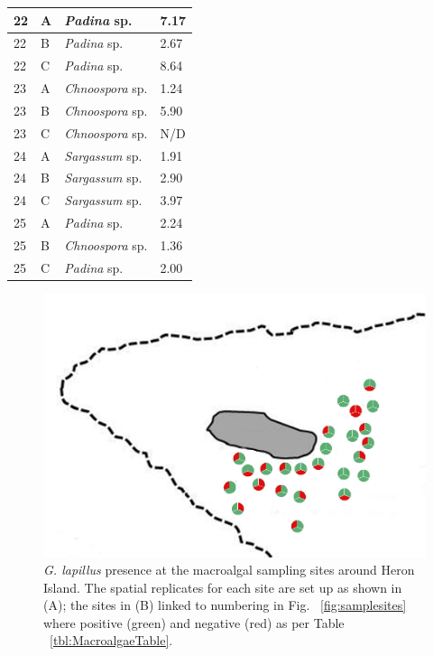 \documentclass[12pt]{article}
\begin{document}
\begin{longtable}{ | p{2cm} | p{2cm} | p{3cm} | p{3.5cm} |}
\hline
22
&A&\emph{Padina} sp.&7.17\\
\hline
22
&B&\emph{Padina} sp.&2.67\\
\hline
22
&C&\emph{Padina} sp.&8.64\\
\hline
23&A&\emph{Chnoospora }sp.&1.24
\\
\hline
23&B&\emph{Chnoospora }sp.&5.90
\\
\hline
23&C&\emph{Chnoospora} sp.&N/D\\
\hline
24&A&\emph{Sargassum} sp.&1.91
\\
\hline
24&B&\emph{Sargassum} sp.&2.90
\\
\hline
24&C&\emph{Sargassum} sp.&3.97
\\
\hline
25&A&\emph{Padina} sp.%
&2.24
\\
\hline
25&B&\emph{Chnoospora }sp.%
&1.36
\\
\hline
25&C&\emph{Padina} sp.%
&2.00
\\
\hline
\end{longtable}
\FloatBarrier
\begin{figure} 
\includegraphics[scale=2.5]{Hero_qpcr-figs/Fig5.png} 
\caption{\emph{G. lapillus} presence at the macroalgal sampling sites around Heron Island. The spatial replicates for each site are set up as shown in (A); the sites in (B) linked to numbering in Fig. ~\ref{fig:samplesites} where positive (green) and negative (red) as per Table ~\ref{tbl:MacroalgaeTable}.} 
\label{fig:envposneg}
\end{figure} 
 
\end{document}

